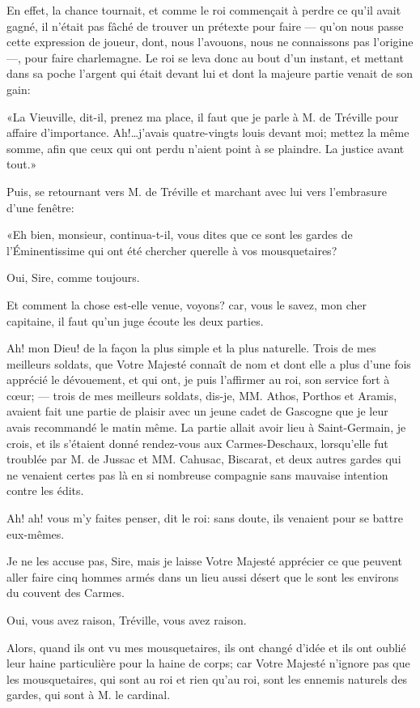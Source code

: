 En effet, la chance tournait, et comme le roi commençait à perdre ce qu'il avait gagné, il n'était pas fâché de trouver un prétexte pour faire --- qu'on nous passe cette expression de joueur, dont, nous l'avouons, nous ne connaissons pas l'origine ---, pour faire charlemagne. Le roi se leva donc au bout d'un instant, et mettant dans sa poche l'argent qui était devant lui et dont la majeure partie venait de son gain: 

«La Vieuville, dit-il, prenez ma place, il faut que je parle à M. de Tréville pour affaire d'importance. Ah!\dots j'avais quatre-vingts louis devant moi; mettez la même somme, afin que ceux qui ont perdu n'aient point à se plaindre. La justice avant tout.» 

Puis, se retournant vers M. de Tréville et marchant avec lui vers l'embrasure d'une fenêtre: 

«Eh bien, monsieur, continua-t-il, vous dites que ce sont les gardes de l'Éminentissime qui ont été chercher querelle à vos mousquetaires? 

\speak  Oui, Sire, comme toujours. 

\speak  Et comment la chose est-elle venue, voyons? car, vous le savez, mon cher capitaine, il faut qu'un juge écoute les deux parties. 

\speak  Ah! mon Dieu! de la façon la plus simple et la plus naturelle. Trois de mes meilleurs soldats, que Votre Majesté connaît de nom et dont elle a plus d'une fois apprécié le dévouement, et qui ont, je puis l'affirmer au roi, son service fort à cœur; --- trois de mes meilleurs soldats, dis-je, MM. Athos, Porthos et Aramis, avaient fait une partie de plaisir avec un jeune cadet de Gascogne que je leur avais recommandé le matin même. La partie allait avoir lieu à Saint-Germain, je crois, et ils s'étaient donné rendez-vous aux Carmes-Deschaux, lorsqu'elle fut troublée par M. de Jussac et MM. Cahusac, Biscarat, et deux autres gardes qui ne venaient certes pas là en si nombreuse compagnie sans mauvaise intention contre les édits. 

\speak  Ah! ah! vous m'y faites penser, dit le roi: sans doute, ils venaient pour se battre eux-mêmes. 

\speak  Je ne les accuse pas, Sire, mais je laisse Votre Majesté apprécier ce que peuvent aller faire cinq hommes armés dans un lieu aussi désert que le sont les environs du couvent des Carmes. 

\speak  Oui, vous avez raison, Tréville, vous avez raison. 

\speak  Alors, quand ils ont vu mes mousquetaires, ils ont changé d'idée et ils ont oublié leur haine particulière pour la haine de corps; car Votre Majesté n'ignore pas que les mousquetaires, qui sont au roi et rien qu'au roi, sont les ennemis naturels des gardes, qui sont à M. le cardinal. 

